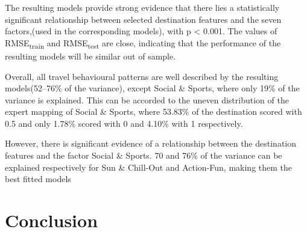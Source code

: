 					
The resulting models provide strong evidence that there lies a statistically significant relationship between selected destination features and the seven factors,(used in the corresponding models), with p < 0.001. The values of  RMSE\textsubscript{train} and RMSE\textsubscript{test} are close, indicating that the performance of the resulting models will be similar out of sample.  
					
Overall, all travel behavioural patterns are well described by the resulting models(52–76\% of the variance), except Social \& Sports, where only 19\% of the variance is explained. This can be accorded to the uneven distribution of the expert mapping of Social \& Sports, where 53.83\% of the destination scored with 0.5 and only 1.78\% scored with 0 and 4.10\% with 1 respectively.

However, there is significant evidence of a relationship between the destination features and the factor Social \& Sports. 70 and 76\% of the variance can be explained respectively for Sun \& Chill-Out and Action-Fun, making them the best fitted models
				
				




  
\section{Conclusion}



